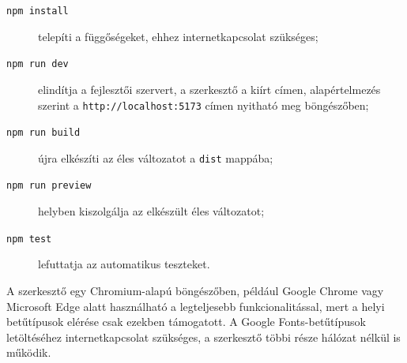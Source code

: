 \begin{description}
\item[\texttt{npm install}] telepíti a függőségeket, ehhez internetkapcsolat szükséges;
\item[\texttt{npm run dev}] elindítja a fejlesztői szervert, a szerkesztő a kiírt címen, alapértelmezés szerint a \texttt{http://localhost:5173} címen nyitható meg böngészőben;
\item[\texttt{npm run build}] újra elkészíti az éles változatot a \texttt{dist} mappába;
\item[\texttt{npm run preview}] helyben kiszolgálja az elkészült éles változatot;
\item[\texttt{npm test}] lefuttatja az automatikus teszteket.
\end{description}

A szerkesztő egy Chromium-alapú böngészőben, például Google Chrome vagy Microsoft Edge alatt használható a legteljesebb funkcionalitással, mert a helyi betűtípusok elérése csak ezekben támogatott. A Google Fonts-betűtípusok letöltéséhez internetkapcsolat szükséges, a szerkesztő többi része hálózat nélkül is működik.
